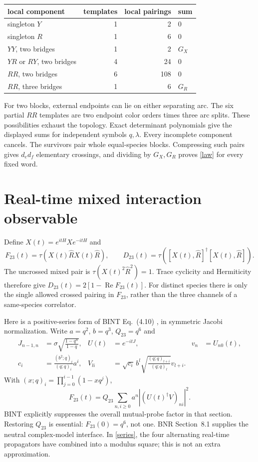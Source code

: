 \documentclass[11pt,a4paper]{article}
\newcommand{\av}[1]{\tau\!\left(#1\right)}
\newcommand{\Rh}{\widehat R}
\newcommand{\sig}{\sigma}
\begin{document}
\begin{center}
\begin{tabular}{lrrl}
\toprule
local component&templates&local pairings&sum\\\midrule
singleton $Y$&1&2&0\\
singleton $R$&1&6&0\\
$YY$, two bridges&1&2&$G_X$\\
$YR$ or $RY$, two bridges&4&24&0\\
$RR$, two bridges&6&108&0\\
$RR$, three bridges&1&6&$G_R$\\\bottomrule
\end{tabular}
\end{center}
For two blocks, external endpoints can lie on either separating arc.
The six partial $RR$ templates are two endpoint color orders times three
arc splits. These possibilities exhaust the topology. Exact determinant
polynomials give the displayed sums for independent symbols $q,\lambda$.
Every incomplete component cancels. The survivors pair whole equal-species
blocks. Compressing such pairs gives $d_e d_f$ elementary crossings,
and dividing by $G_X,G_R$ proves \eqref{law} for every fixed word.

\newpage
\section{Real-time mixed interaction observable}
Define $X(t)=e^{itH}Xe^{-itH}$ and
\begin{equation}
 F_{23}(t)=\av{X(t)\Rh X(t)\Rh},\qquad
 D_{23}(t)=\av{[X(t),\Rh]^\dagger[X(t),\Rh]}.
\end{equation}
The uncrossed mixed pair is $\av{X(t)^2\Rh^2}=1$. Trace cyclicity and
Hermiticity therefore give $D_{23}(t)=2[1-\operatorname{Re}F_{23}(t)]$.
For distinct species there is only the single allowed crossed pairing
in $F_{23}$, rather than the three channels of a same-species correlator.

Here is a positive-series form of BINT Eq.~(4.10) \cite{bint}, in symmetric
Jacobi normalization. Write $a=q^2$, $b=q^3$, $Q_{23}=q^6$ and
\begin{align}
 J_{n-1,n}&=\sig\sqrt{\frac{1-q^n}{1-q}},&U(t)&=e^{-itJ},&v_n&=U_{n0}(t),\\
 c_i&=\frac{(b^2;q)_i}{(q;q)_i}a^i,&
 V_{li}&=\sqrt{c_i}\,b^l
       \sqrt{\frac{(q;q)_{l+i}}{(q;q)_l}}v_{l+i}.
\end{align}
With $(x;q)_i=\prod_{j=0}^{i-1}(1-xq^j)$,
\begin{equation}
 \boxed{F_{23}(t)=Q_{23}\sum_{n,i\ge0}a^n
                    |(U(t)^\dagger V)_{ni}|^2.}\label{series}
\end{equation}
BINT explicitly suppresses the overall mutual-probe factor in that
section. Restoring $Q_{23}$ is essential: $F_{23}(0)=q^6$, not one.
BNR Section~8.1 \cite{bnr} supplies the neutral complex-model interface.
In \eqref{series}, the four alternating real-time propagators have
combined into a modulus square; this is not an extra approximation.
\end{document}

